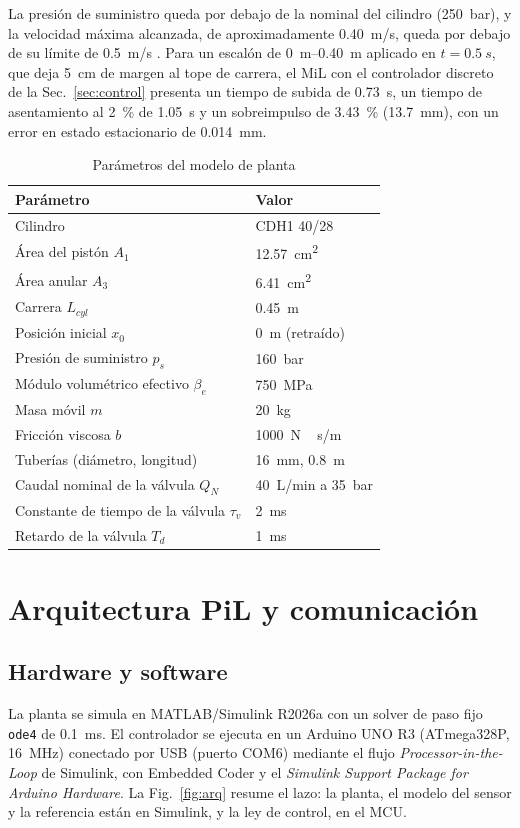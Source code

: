 \documentclass[conference]{IEEEtran}
\begin{document}
La presión de suministro queda por debajo de la nominal del cilindro (\SI{250}{bar}), y la velocidad máxima alcanzada, de aproximadamente \SI{0.40}{m/s}, queda por debajo de su límite de \SI{0.5}{m/s} \cite{rexroth}. Para un escalón de \SIrange{0}{0.40}{m} aplicado en $t=\SI{0.5}{s}$, que deja \SI{5}{cm} de margen al tope de carrera, el MiL con el controlador discreto de la Sec.~\ref{sec:control} presenta un tiempo de subida de \SI{0.73}{s}, un tiempo de asentamiento al \SI{2}{\percent} de \SI{1.05}{s} y un sobreimpulso de \SI{3.43}{\percent} (\SI{13.7}{mm}), con un error en estado estacionario de \SI{0.014}{mm}.

\begin{table}[H]
\centering
\caption{Parámetros del modelo de planta}
\label{tab:planta}
\small
\begin{tabularx}{\columnwidth}{Ll}
\toprule
Parámetro & Valor \\
\midrule
Cilindro \cite{rexroth} & CDH1 40/28 \\
Área del pistón $A_1$ & \SI{12.57}{cm^2} \\
Área anular $A_3$ & \SI{6.41}{cm^2} \\
Carrera $L_{cyl}$ & \SI{0.45}{m} \\
Posición inicial $x_0$ & \SI{0}{m} (retraído) \\
Presión de suministro $p_s$ & \SI{160}{bar} \\
Módulo volumétrico efectivo $\beta_e$ & \SI{750}{MPa} \\
Masa móvil $m$ & \SI{20}{kg} \\
Fricción viscosa $b$ & \SI{1000}{N\,s/m} \\
Tuberías (diámetro, longitud) & \SI{16}{mm}, \SI{0.8}{m} \\
Caudal nominal de la válvula $Q_N$ & \SI{40}{L/min} a \SI{35}{bar} \\
Constante de tiempo de la válvula $\tau_v$ & \SI{2}{ms} \\
Retardo de la válvula $T_d$ & \SI{1}{ms} \\
\bottomrule
\end{tabularx}
\end{table}

\section{Arquitectura PiL y comunicación}
\label{sec:arq}

\subsection{Hardware y software}
La planta se simula en MATLAB/Simulink R2026a con un solver de paso fijo \texttt{ode4} de \SI{0.1}{ms}. El controlador se ejecuta en un Arduino UNO R3 (ATmega328P, \SI{16}{MHz}) conectado por USB (puerto COM6) mediante el flujo \textit{Processor-in-the-Loop} de Simulink, con Embedded Coder y el \textit{Simulink Support Package for Arduino Hardware}. La Fig.~\ref{fig:arq} resume el lazo: la planta, el modelo del sensor y la referencia están en Simulink, y la ley de control, en el MCU.
\end{document}
